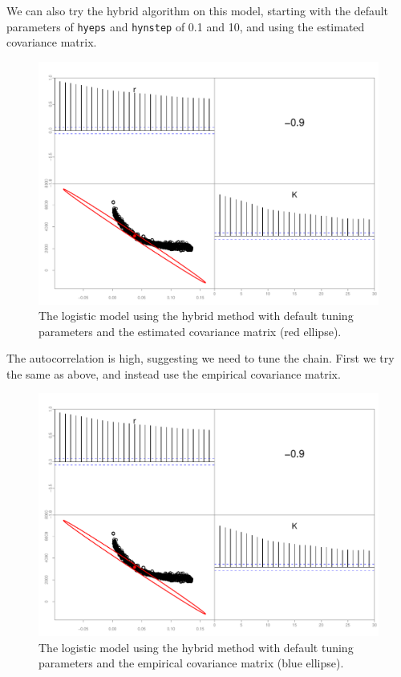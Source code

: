 \documentclass{article}\usepackage[]{graphicx}\usepackage[]{color}
\begin{document}
We can also try the hybrid algorithm on this model, starting
with the default parameters of \texttt{hyeps} and
\texttt{hynstep} of 0.1 and 10, and using the estimated
covariance matrix.
\begin{figure}[h]
  \centering
  \includegraphics[width=5in]{../plots/logistic_hy.pdf}
  \caption{The logistic model using the hybrid method with
    default tuning parameters and the estimated covariance matrix
    (red ellipse).}
  \label{fig:logistic_hy}
\end{figure}
The autocorrelation is high, suggesting we need to tune the
chain. First we try the same as above, and instead use the
empirical covariance matrix.
\begin{figure}[h]
  \centering
  \includegraphics[width=5in]{../plots/logistic_hy.pdf}
  \caption{The logistic model using the hybrid method with
    default tuning parameters and the empirical covariance matrix
    (blue ellipse).}
  \label{fig:logistic_hy2}
\end{figure}
\end{document}
